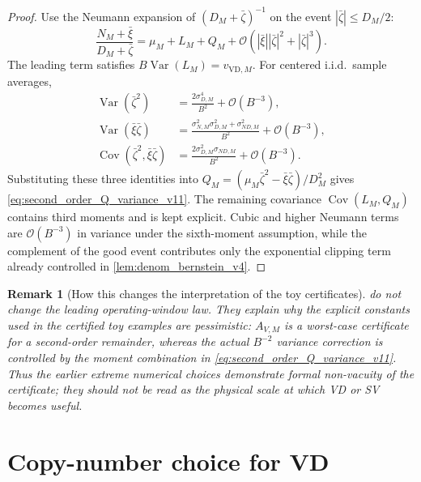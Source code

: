 \documentclass[11pt]{article}
\newtheorem{remark}{Remark}
\newcommand{\Var}{\operatorname{Var}}
\newcommand{\Cov}{\operatorname{Cov}}
\newcommand{\1}{\mathbf{1}}
\newcommand{\OO}{\mathcal{O}}
\newcommand{\abs}[1]{\left\lvert #1 \right\rvert}
\begin{document}
\begin{proof}
Use the Neumann expansion of \((D_M+\bar\zeta)^{-1}\) on the event \(\abs{\bar\zeta}\le D_M/2\):
\begin{equation}
    \frac{N_M+\bar\xi}{D_M+\bar\zeta}
    =\mu_M+L_M+Q_M+\OO\!\left(\abs{\bar\xi}\abs{\bar\zeta}^2+\abs{\bar\zeta}^3\right).
\end{equation}
The leading term satisfies \(B\Var(L_M)=v_{\mathrm{VD},M}\).  For centered i.i.d.\ sample averages,
\begin{align}
    \Var(\bar\zeta^2)&=\frac{2\sigma_{D,M}^4}{B^2}+\OO(B^{-3}),\\
    \Var(\bar\xi\bar\zeta)&=\frac{\sigma_{N,M}^2\sigma_{D,M}^2+\sigma_{ND,M}^2}{B^2}+\OO(B^{-3}),\\
    \Cov(\bar\zeta^2,\bar\xi\bar\zeta)&=\frac{2\sigma_{D,M}^2\sigma_{ND,M}}{B^2}+\OO(B^{-3}).
\end{align}
Substituting these three identities into \(Q_M=(\mu_M\bar\zeta^2-\bar\xi\bar\zeta)/D_M^2\) gives \cref{eq:second_order_Q_variance_v11}.  The remaining covariance \(\Cov(L_M,Q_M)\) contains third moments and is kept explicit.  Cubic and higher Neumann terms are \(\OO(B^{-3})\) in variance under the sixth-moment assumption, while the complement of the good event contributes only the exponential clipping term already controlled in \cref{lem:denom_bernstein_v4}.
\end{proof}

\begin{remark}[How this changes the interpretation of the toy certificates]
\label{rem:sharp_variance_interpretation_v11}
 do not change the leading operating-window law.  They explain why the explicit constants used in the certified toy examples are pessimistic: \(A_{V,M}\) is a worst-case certificate for a second-order remainder, whereas the actual \(B^{-2}\) variance correction is controlled by the moment combination in \cref{eq:second_order_Q_variance_v11}.  Thus the earlier extreme numerical choices demonstrate formal non-vacuity of the certificate; they should not be read as the physical scale at which VD or SV becomes useful.
\end{remark}






\section{Copy-number choice for VD}
\end{document}
